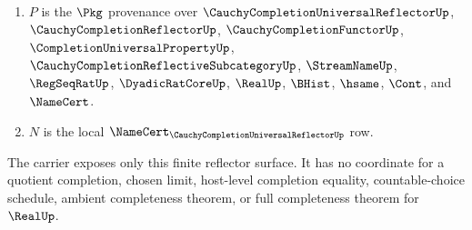 \begin{definition}
\begin{enumerate}
\item $P$ is the $\Pkg$ provenance over $\CauchyCompletionUniversalReflectorUp$, $\CauchyCompletionReflectorUp$, $\CauchyCompletionFunctorUp$, $\CompletionUniversalPropertyUp$, $\CauchyCompletionReflectiveSubcategoryUp$, $\StreamNameUp$, $\RegSeqRatUp$, $\DyadicRatCoreUp$, $\RealUp$, $\BHist$, $\hsame$, $\Cont$, and $\NameCert$.
\item $N$ is the local $\NameCert_{\CauchyCompletionUniversalReflectorUp}$ row.
\end{enumerate}
The carrier exposes only this finite reflector surface. It has no coordinate for a quotient completion, chosen limit, host-level completion equality, countable-choice schedule, ambient completeness theorem, or full completeness theorem for $\RealUp$.
\end{definition}

